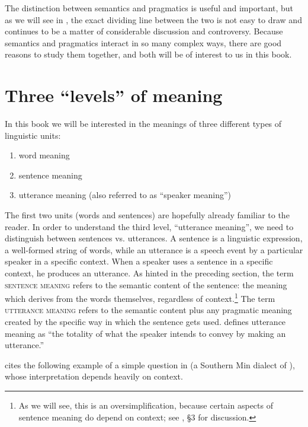 The distinction between semantics and pragmatics is useful and important, but as we will see in , the exact dividing line between the two is not easy to draw and continues to be a matter of considerable discussion and controversy. Because semantics and pragmatics interact in so many complex ways, there are good reasons to study them together, and both will be of interest to us in this book.


\section{Three “levels” of meaning}\label{sec:1.2}

In this book we will be interested in the meanings of three different types of linguistic units:


\begin{enumerate}
\item word meaning
\item sentence meaning
\item utterance meaning (also referred to as “speaker meaning”)
\end{enumerate}

The first two units (words and sentences) are hopefully already familiar to the reader. In order to understand the third level, “utterance meaning”, we need to distinguish between sentences vs. utterances. A sentence is a linguistic expression, a well-formed string of words, while an utterance is a speech event by a particular speaker in a specific context. When a speaker uses a sentence in a specific context, he produces an utterance. As hinted in the preceding section, the term \textsc{sentence meaning} refers to the semantic content of the sentence: the meaning which derives from the words themselves, regardless of context.\footnote{As we will see, this is an oversimplification, because certain aspects of sentence meaning do depend on context; see , §3 for discussion.} The term \textsc{utterance} \textsc{meaning} refers to the semantic content plus any pragmatic meaning created by the specific way in which the sentence gets used. \citet[27]{Cruse2000} defines utterance meaning as “the totality of what the speaker intends to convey by making an utterance.”



\citet[1]{Kroeger2005} cites the following example of a simple question in  (a Southern Min dialect of ), whose interpretation depends heavily on context.


